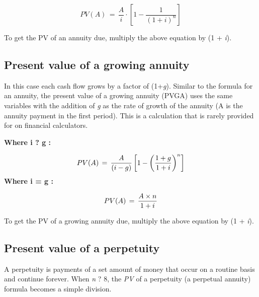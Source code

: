 $$PV(A) \,=\,\frac{A}{i} \cdot \left[ {1-\frac{1}{\left(1+i\right)^n}} \right]$$



To get the PV of an annuity due, multiply the above equation by (1 + \textit{i}).




\subsection{Present value of a growing annuity}
\label{sss:pres-32d2}




In this case each cash flow grows by a factor of (1+\textit{g}). Similar to the formula
for an annuity, the present value of a growing annuity (PVGA) uses the same variables with
the addition of \textit{g} as the rate of growth of the annuity (A is the annuity payment
in the first period). This is a calculation that is rarely provided for on financial
calculators.



\textbf{Where i ? g :}



$$PV(A)\,=\,{A \over (i-g)}\left[ 1- \left({1+g \over 1+i}\right)^n \right]$$ \textbf{Where i = g :}



$$PV(A)\,=\,{A \times n \over 1+i}$$



To get the PV of a growing annuity due, multiply the above equation by (1 + \textit{i}).




\subsection{Present value of a perpetuity}
\label{sss:pres-eef1}




A perpetuity is payments of a set amount of money that occur on a routine basis and
continue forever. When \textit{n} ? 8, the \textit{PV} of a perpetuity (a perpetual
annuity) formula becomes a simple division.



